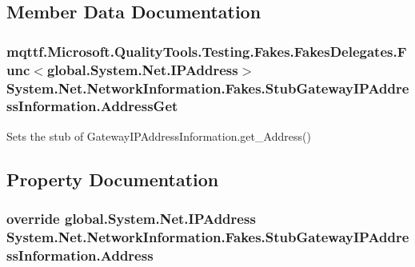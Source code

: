 \subsection{Member Data Documentation}
\hypertarget{class_system_1_1_net_1_1_network_information_1_1_fakes_1_1_stub_gateway_i_p_address_information_a63e2189c535d45753b4ad25a5bf51d07}{
\subsubsection[{Address\-Get}]{\setlength{\rightskip}{0pt plus 5cm}mqttf.\-Microsoft.\-Quality\-Tools.\-Testing.\-Fakes.\-Fakes\-Delegates.\-Func$<$global.\-System.\-Net.\-I\-P\-Address$>$ System.\-Net.\-Network\-Information.\-Fakes.\-Stub\-Gateway\-I\-P\-Address\-Information.\-Address\-Get}}\label{class_system_1_1_net_1_1_network_information_1_1_fakes_1_1_stub_gateway_i_p_address_information_a63e2189c535d45753b4ad25a5bf51d07}


Sets the stub of Gateway\-I\-P\-Address\-Information.\-get\-\_\-\-Address()



\subsection{Property Documentation}
\hypertarget{class_system_1_1_net_1_1_network_information_1_1_fakes_1_1_stub_gateway_i_p_address_information_a3849b9cd0bcf49d545ff2bc1c48028d1}{
\subsubsection[{Address}]{\setlength{\rightskip}{0pt plus 5cm}override global.\-System.\-Net.\-I\-P\-Address System.\-Net.\-Network\-Information.\-Fakes.\-Stub\-Gateway\-I\-P\-Address\-Information.\-Address\hspace{0.3cm}{\ttfamily [get]}}}\label{class_system_1_1_net_1_1_network_information_1_1_fakes_1_1_stub_gateway_i_p_address_information_a3849b9cd0bcf49d545ff2bc1c48028d1}


